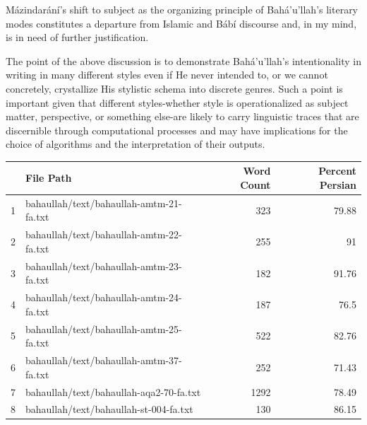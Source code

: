 \documentclass[12pt, oneside]{report}
\begin{document}
M\'{a}zindar\'{a}n\'{i}'s shift to subject as the organizing principle of Bah\'{a}'u'llah's literary modes constitutes a departure from Islamic and B\'{a}b\'{i} discourse and, in my mind, is in need of further justification.
\par
The point of the above discussion is to demonstrate Bah\'{a}'u'llah's intentionality in writing in many different styles even if He never intended to, or we cannot concretely, crystallize His stylistic schema into discrete genres.
Such a point is important given that different styles-whether style is operationalized as subject matter, perspective, or something else-are likely to carry linguistic traces that are discernible through computational processes and may have implications for the choice of algorithms and the interpretation of their outputs.
\begin{table}[]
	\centering
	\begin{tabular}{|l|l|r|r|}
		\hline
		\rowcolor[HTML]{EFEFEF}
		\textbf{} & \textbf{File Path}                       & \textbf{Word Count}         & \textbf{Percent Persian}      \\ \hline
		1         & bahaullah/text/bahaullah-amtm-21-fa.txt  & \cellcolor[HTML]{FFFFFF}323 & \cellcolor[HTML]{FFFFFF}79.88 \\ \hline
		\rowcolor[HTML]{EFEFEF}
		2         & bahaullah/text/bahaullah-amtm-22-fa.txt  & 255                         & 91                            \\ \hline
		\rowcolor[HTML]{FFFFFF}
		3         & bahaullah/text/bahaullah-amtm-23-fa.txt  & 182                         & 91.76                         \\ \hline
		\rowcolor[HTML]{EFEFEF}
		4         & bahaullah/text/bahaullah-amtm-24-fa.txt  & 187                         & 76.5                          \\ \hline
		\rowcolor[HTML]{FFFFFF}
		5         & bahaullah/text/bahaullah-amtm-25-fa.txt  & 522                         & 82.76                         \\ \hline
		\rowcolor[HTML]{EFEFEF}
		6         & bahaullah/text/bahaullah-amtm-37-fa.txt  & 252                         & 71.43                         \\ \hline
		\rowcolor[HTML]{FFFFFF}
		7         & bahaullah/text/bahaullah-aqa2-70-fa.txt  & 1292                        & 78.49                         \\ \hline
		\rowcolor[HTML]{EFEFEF}
		8         & bahaullah/text/bahaullah-st-004-fa.txt   & 130                         & 86.15                         \\ \hline

\end{tabular}
\end{table}
\end{document}
